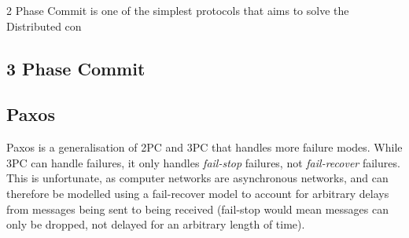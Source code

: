 \documentclass[12pt,twoside,notitlepage]{report}
\begin{document}
2 Phase Commit is one of the simplest protocols that aims to solve the Distributed con

\subsection*{3 Phase Commit}


\subsection*{Paxos}

%
%

Paxos is a generalisation of 2PC and 3PC that handles more failure modes. While 3PC can handle
failures, it only handles \emph{fail-stop} failures, not \emph{fail-recover} failures. This is
unfortunate, as computer networks are asynchronous networks, and can therefore be modelled using a
fail-recover model to account for arbitrary delays from messages being sent to being received
(fail-stop would mean messages can only be dropped, not delayed for an arbitrary length of time).
\end{document}
